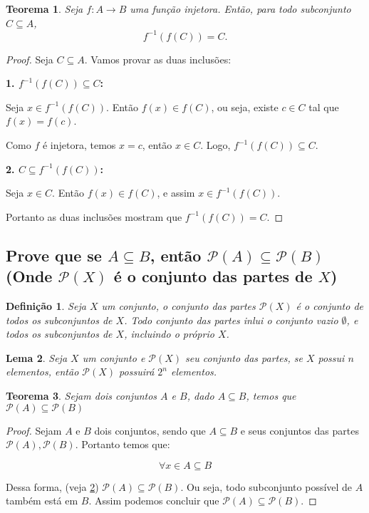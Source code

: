 \documentclass{article}
\newtheorem{definition}{Definição}
\newtheorem{theorem}{Teorema}[section]
\newtheorem{lemma}[theorem]{Lema}
\begin{document}
\begin{theorem}
Seja \( f: A \to B \) uma função injetora. Então, para todo subconjunto \( C \subseteq A \),
\[
    f^{-1}(f(C)) = C.
\]
\end{theorem}

\begin{proof}
Seja \( C \subseteq A \). Vamos provar as duas inclusões:

\textbf{1. \( f^{-1}(f(C)) \subseteq C \):}

Seja \( x \in f^{-1}(f(C)) \). Então \( f(x) \in f(C) \), ou seja, existe \( c \in C \) tal que \( f(x) = f(c) \).

Como \( f \) é injetora, temos \( x = c \), então \( x \in C \). Logo, \( f^{-1}(f(C)) \subseteq C \).

\textbf{2. \( C \subseteq f^{-1}(f(C)) \):}

Seja \( x \in C \). Então \( f(x) \in f(C) \), e assim \( x \in f^{-1}(f(C)) \).

Portanto as duas inclusões mostram que \( f^{-1}(f(C)) = C \).
\end{proof}

\subsection{Prove que se $A \subseteq B$, então $\mathcal{P}(A) \subseteq \mathcal{P}(B)$ (Onde $\mathcal{P}(X)$ é o conjunto das partes de $X$)}

\begin{definition}
    Seja $X$ um conjunto, o conjunto das partes $\mathcal{P}(X)$ é o conjunto de todos os subconjuntos de $X$. Todo conjunto das partes inlui o conjunto vazio $\emptyset$, e todos os subconjuntos de $X$, incluindo o próprio $X$.
    
\end{definition}

\begin{lemma}
    \label{Conjunto das partes}
    Seja $X$ um conjunto e $\mathcal{P}(X)$ seu conjunto das partes, se $X$ possui $n$ elementos, então $\mathcal{P}(X)$ possuirá $2^n$ elementos. 
\end{lemma}

\begin{theorem}
    Sejam dois conjuntos $A$ e $B$, dado $A \subseteq B$, temos que $\mathcal{P}(A) \subseteq \mathcal{P}(B)$ 
\end{theorem}

\begin{proof}
    Sejam $A$ e $B$ dois conjuntos, sendo que $A \subseteq B$ e seus conjuntos das partes $\mathcal{P}(A), \mathcal{P}(B)$. Portanto temos que:

    $$\forall x \in A \subseteq B$$

    Dessa forma, (veja \ref{Conjunto das partes}) $\mathcal{P}(A) \subseteq \mathcal{P}(B)$. Ou seja,  todo subconjunto possível de $A$ também está em $B$. Assim podemos concluir que $\mathcal{P}(A) \subseteq \mathcal{P}(B)$.
\end{proof}
\end{document}
